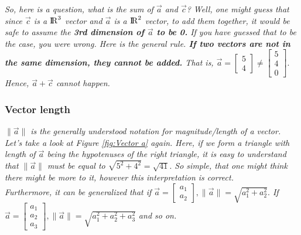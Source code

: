 \documentclass[addpoints]{exam}
\begin{document}
\textit{
So, here is a question, what is the sum of $\vec{a}$ and $\vec{c}$? Well, one might guess that since $\vec{c}$ is a ${\rm I\!R}^3$ vector and $\vec{a}$ is a ${\rm I\!R}^2$ vector, to add them together, it would be safe to assume the \textbf{3rd dimension of $\vec{a}$ to be 0.} If you have guessed that to be the case, you were wrong. Here is the general rule. \textbf{If two vectors are not in the same dimension, they cannot be added.} That is, $\vec{a}=\begin{bmatrix}5\\4\end{bmatrix} \neq \begin{bmatrix} 5\\4\\0\end{bmatrix}.$ Hence, $\vec{a}+\vec{c}$ cannot happen.
}

\subsubsection{Vector length}
\textit{$\|\vec{a}\|$ is the generally understood notation for magnitude/length of a vector. Let's take a look at Figure \ref{fig:Vector a} again. Here, if we form a triangle with length of $\vec{a}$ being the hypotenuses of the right triangle, it is easy to understand that $\|\vec{a}\|$ must be equal to $\sqrt{5^2+4^2} =\sqrt{41}.$ So simple, that one might think there might be more to it, however this interpretation is correct. \\Furthermore, it can be generalized that if $\vec{a} = \begin{bmatrix}a_1\\a_2\end{bmatrix}, \|\vec{a}\| = \sqrt{a_1^2+a_2^2}.$ If $\vec{a} = \begin{bmatrix}a_1\\a_2\\a_3\end{bmatrix}, \|\vec{a}\| = \sqrt{a_1^2+a_2^2+a_3^2}$ and so on.}
\end{document}
